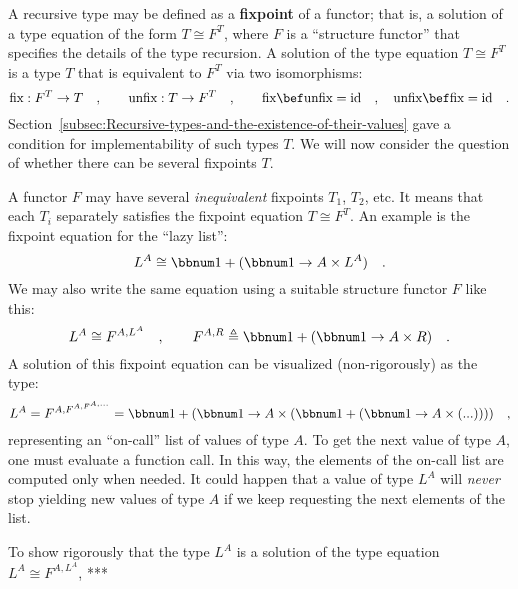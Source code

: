 A recursive type may be defined as a \textbf{fixpoint} of
a functor; that is, a solution of a type equation
of the form $T\cong F^{T}$, where $F$ is a \textsf{``}structure functor\textsf{''}
that specifies the details of the type recursion. A solution of the
type equation $T\cong F^{T}$ is a type $T$ that is equivalent to
$F^{T}$ via two isomorphisms:
\[
\text{fix}:F^{T}\rightarrow T\quad,\quad\quad\text{unfix}:T\rightarrow F^{T}\quad,\quad\quad\text{fix}\bef\text{unfix}=\text{id}\quad,\quad\text{unfix}\bef\text{fix}=\text{id}\quad.
\]
Section~\ref{subsec:Recursive-types-and-the-existence-of-their-values}
gave a condition for implementability of such types $T$. We will
now consider the question of whether there can be several fixpoints
$T$.

A functor $F$ may have several \emph{inequivalent} fixpoints $T_{1}$,
$T_{2}$, etc. It means that each $T_{i}$ separately satisfies the
fixpoint equation $T\cong F^{T}$. An example is the fixpoint equation
for the \textsf{``}lazy list\textsf{''}:
\begin{equation}
L^{A}\cong\bbnum 1+(\bbnum 1\rightarrow A\times L^{A})\quad.\label{eq:fixpoint-type-equation-for-oncall-list}
\end{equation}
We may also write the same equation using a suitable structure functor
$F$ like this:
\[
L^{A}\cong F^{A,L^{A}}\quad,\quad\quad F^{A,R}\triangleq\bbnum 1+(\bbnum 1\rightarrow A\times R)\quad.
\]
A solution of this fixpoint equation can be visualized (non-rigorously)
as the type:
\[
L^{A}=F^{A,F^{A,F^{A,...}}}=\bbnum 1+(\bbnum 1\rightarrow A\times(\bbnum 1+(\bbnum 1\rightarrow A\times(...))))\quad,
\]
representing an \textsf{``}on-call\textsf{''} list of values of type $A$. To get
the next value of type $A$, one must evaluate a function call. In
this way, the elements of the on-call list are computed only when
needed. It could happen that a value of type $L^{A}$ will \emph{never}
stop yielding new values of type $A$ if we keep requesting the next
elements of the list.

To show rigorously that the type $L^{A}$ is a solution of the type
equation $L^{A}\cong F^{A,L^{A}}$, {*}{*}{*}

